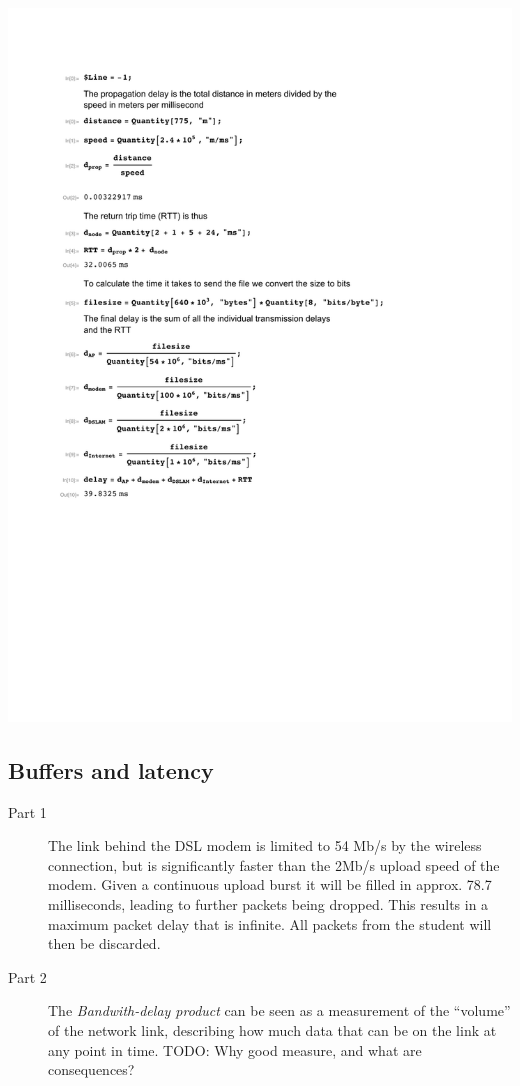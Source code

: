 \documentclass[a4paper]{article}
\begin{document}
\includegraphics{../calc2.pdf}

\subsection{Buffers and latency}
\begin{description}
    \item[Part 1] The link behind the DSL modem is limited to 54 Mb/s by the wireless connection,
        but is significantly faster than the 2Mb/s upload speed of the modem. Given a continuous
        upload burst it will be filled in approx. 78.7 milliseconds, leading to further packets being
        dropped. This results in a maximum packet delay that is infinite. All packets from the student
        will then be discarded.
    \item[Part 2] The \emph{Bandwith-delay product} can be seen as a measurement of the
        ``volume'' of the network link, describing how much data that can be on the link at
        any point in time.
        TODO: Why good measure, and what are consequences?
\end{description}
\end{document}
